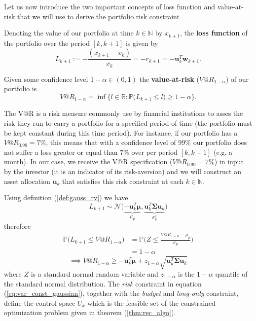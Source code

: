 Let us now introduce the two important concepts of loss function and value-at-risk that we will use to derive the portfolio risk constraint
\begin{definition}\label{def:loss_function}
	Denoting the value of our portfolio at time $k \in \mathbb{N}$ by $x_{k+1}$, the \textbf{loss function} of the portfolio over the period $[k,k+1]$ is given by \[ L_{k+1}:= -\frac{(x_{k+1}-x_k)}{x_k}= -r_{k+1} = -\bm{u}_k^T \bm{w}_{k+1}.  \]
\end{definition}
\begin{definition}
	Given some confidence level $1-\alpha \in (0,1) $ the \textbf{value-at-risk} ($V@R_{1-\alpha}$) of our portfolio is \[ V@R_{1-\alpha} = \inf\{l\in \mathbb{R} : \mathbb{P}\big(L_{k+1} \leq l \big) \geq 1-\alpha \}. \]
\end{definition}
	

The V@R is a risk measure commonly use by financial institutions to asses the risk they run to carry a portfolio for a specified period of time (the portfolio must be kept constant during this time period). For instance, if our portfolio has a $V@R_{0.99} = 7\%$, this means that with a confidence level of $99\%$ our portfolio does not suffer a loss greater or equal than $7\%$ over per period $[k,k+1]$ (e.g. a month). In our case, we receive the V@R specification ($V@R_{0.99} = 7\%$) in input by the investor (it is an indicator of its risk-aversion) and we will construct an asset allocation $\bm{u}_k$ that satisfies this risk constraint at each $k \in \mathbb{N}$.

Using definition (\ref{def:gauss_rv}) we have \[ L_{k+1} \sim \mathcal{N}\big(\underbrace{-\bm{u}_k^T \bm{\mu}}_{\mu_p},\underbrace{\bm{u}_k^T \bm{\Sigma} \bm{u}_k}_{\sigma^2_p} \big)\] therefore
\begin{align*}
\mathbb{P}\big(L_{k+1} \leq V@R_{1-\alpha}\big) 
& = \mathbb{P}\Big(Z \leq \frac{V@R_{1-\alpha} - \mu_p}{\sigma_p}  \Big) \\
& = 1 - \alpha
\end{align*}
\begin{equation}\label{eq:var_const_gaussian}
\implies \boxed{V@R_{1-\alpha} \geq -\bm{u}_k^T\bm{\mu} + z_{1-\alpha} \sqrt{\bm{u}_k^T \bm{\Sigma} \bm{u}_k}}
\end{equation}
where $Z$ is a standard normal random variable and $z_{1-\alpha}$ is the $1-\alpha$ quantile of the standard normal distribution. The \textit{risk} constraint in equation (\ref{eq:var_const_gaussian}), together with the \textit{budget} and \textit{long-only} constraint, define the control space $U_k$ which is the feasible set of the constrained optimization problem given in theorem (\ref{thm:rec_algo}).
